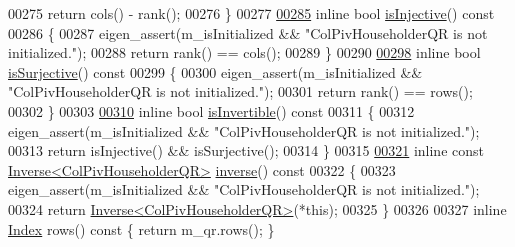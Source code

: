 \begin{DoxyCode}
00275       \textcolor{keywordflow}{return} cols() - rank();
00276     \}
00277 
\hyperlink{group___q_r___module_a0031998053c9c7345c9458f7443aa263}{00285}     \textcolor{keyword}{inline} \textcolor{keywordtype}{bool} \hyperlink{group___q_r___module_a0031998053c9c7345c9458f7443aa263}{isInjective}()\textcolor{keyword}{ const}
00286 \textcolor{keyword}{    }\{
00287       eigen\_assert(m\_isInitialized && \textcolor{stringliteral}{"ColPivHouseholderQR is not initialized."});
00288       \textcolor{keywordflow}{return} rank() == cols();
00289     \}
00290 
\hyperlink{group___q_r___module_a87a7d06e0b0479e5b56b19c2a4f56365}{00298}     \textcolor{keyword}{inline} \textcolor{keywordtype}{bool} \hyperlink{group___q_r___module_a87a7d06e0b0479e5b56b19c2a4f56365}{isSurjective}()\textcolor{keyword}{ const}
00299 \textcolor{keyword}{    }\{
00300       eigen\_assert(m\_isInitialized && \textcolor{stringliteral}{"ColPivHouseholderQR is not initialized."});
00301       \textcolor{keywordflow}{return} rank() == rows();
00302     \}
00303 
\hyperlink{group___q_r___module_a945720f8d683f8ebe97fa807edd3142a}{00310}     \textcolor{keyword}{inline} \textcolor{keywordtype}{bool} \hyperlink{group___q_r___module_a945720f8d683f8ebe97fa807edd3142a}{isInvertible}()\textcolor{keyword}{ const}
00311 \textcolor{keyword}{    }\{
00312       eigen\_assert(m\_isInitialized && \textcolor{stringliteral}{"ColPivHouseholderQR is not initialized."});
00313       \textcolor{keywordflow}{return} isInjective() && isSurjective();
00314     \}
00315 
\hyperlink{group___q_r___module_a31c45402e74774d9cd13af0e57a6b72f}{00321}     \textcolor{keyword}{inline} \textcolor{keyword}{const} \hyperlink{class_eigen_1_1_inverse}{Inverse<ColPivHouseholderQR>} 
      \hyperlink{group___q_r___module_a31c45402e74774d9cd13af0e57a6b72f}{inverse}()\textcolor{keyword}{ const}
00322 \textcolor{keyword}{    }\{
00323       eigen\_assert(m\_isInitialized && \textcolor{stringliteral}{"ColPivHouseholderQR is not initialized."});
00324       \textcolor{keywordflow}{return} \hyperlink{class_eigen_1_1_inverse}{Inverse<ColPivHouseholderQR>}(*this);
00325     \}
00326 
00327     \textcolor{keyword}{inline} \hyperlink{namespace_eigen_a62e77e0933482dafde8fe197d9a2cfde}{Index} rows()\textcolor{keyword}{ const }\{ \textcolor{keywordflow}{return} m\_qr.rows(); \}

\end{DoxyCode}
